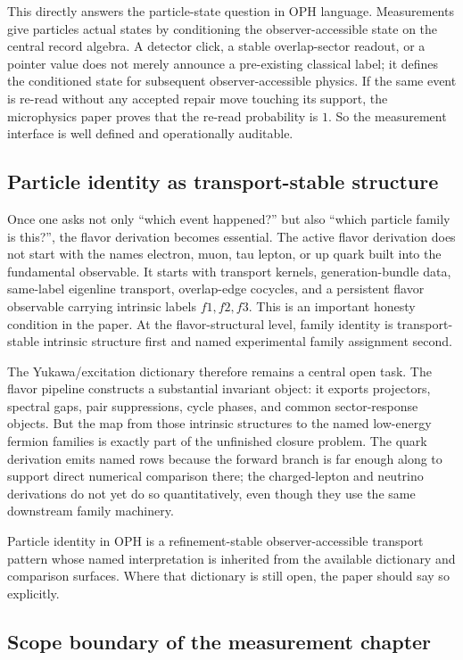 \documentclass[11pt]{article}
\begin{document}
This directly answers the particle-state question in OPH language. Measurements give particles
actual states by conditioning the observer-accessible state on the central record algebra. A
detector click, a stable overlap-sector readout, or a pointer value does not merely announce a
pre-existing classical label; it defines the conditioned state for subsequent observer-accessible
physics. If the same event is re-read without any accepted repair move touching its support, the
microphysics paper proves that the re-read probability is \(1\). So the measurement interface is
well defined and operationally auditable.

\subsection{Particle identity as transport-stable structure}

Once one asks not only ``which event happened?'' but also ``which particle family is this?'', the
flavor derivation becomes essential. The active flavor derivation does not start with the
names electron, muon, tau lepton, or up quark built into the fundamental observable. It starts
with transport kernels, generation-bundle data, same-label eigenline transport, overlap-edge
cocycles, and a persistent flavor observable carrying intrinsic labels \(f1,f2,f3\). This is an
important honesty condition in the paper. At the flavor-structural level, family
identity is transport-stable intrinsic structure first and named experimental family assignment
second.

The Yukawa/excitation dictionary therefore remains a central open task. The flavor
pipeline constructs a substantial invariant object: it exports projectors, spectral
gaps, pair suppressions, cycle phases, and common sector-response objects. But the map from those
intrinsic structures to the named low-energy fermion families is exactly part of the unfinished
closure problem. The quark derivation emits named rows because the forward
branch is far enough along to support direct numerical comparison there; the charged-lepton and
neutrino derivations do not yet do so quantitatively, even though they use the same downstream family
machinery.

Particle identity in OPH is a refinement-stable
observer-accessible transport pattern whose named interpretation is inherited from the
available dictionary and comparison surfaces. Where that dictionary is still open, the paper should say
so explicitly.

\subsection{Scope boundary of the measurement chapter}
\end{document}
